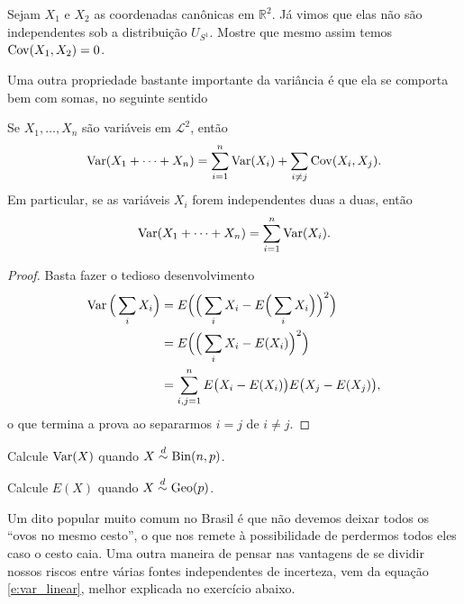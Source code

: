 \begin{exercise}
  Sejam $X_1$ e $X_2$ as coordenadas canônicas em $\mathbb{R}^2$.
  Já vimos que elas não são independentes sob a distribuição $U_{S^1}$.
  Mostre que mesmo assim temos $\operatorname{Cov}(X_1, X_2) = 0$.
\end{exercise}

Uma outra propriedade bastante importante da variância é que ela se comporta bem com somas, no seguinte sentido
\begin{proposition}
  Se $X_1, \dots, X_n$ são variáveis em $\mathcal{L}^2$, então
  \begin{equation}
    \operatorname{Var}(X_1 + \dots + X_n) = \sum_{i=1}^n \operatorname{Var}(X_i) + \sum_{i \neq j} \operatorname{Cov}(X_i, X_j).
  \end{equation}
  Em particular, se as variáveis $X_i$ forem independentes duas a duas, então
  \begin{equation}
    \label{e:var_linear}
    \operatorname{Var}(X_1 + \dots + X_n) = \sum_{i=1}^n \operatorname{Var}(X_i).
  \end{equation}
\end{proposition}

\begin{proof}
  Basta fazer o tedioso desenvolvimento
  \begin{equation}
    \begin{split}
      \operatorname{Var}\Big(\sum_i X_i\Big) & = E \Big( \Big(\sum_i X_i - E\Big(\sum_i X_i\Big)\Big)^2\Big)\\
      & = E \Big( \Big(\sum_i X_i - E(X_i)\Big)^2\Big)\\
      & = \sum_{i, j = 1}^n E \big(X_i - E(X_i)\big) E\big(X_j - E(X_j)\big),
    \end{split}
  \end{equation}
  o que termina a prova ao separarmos $i = j$ de $i \neq j$.
\end{proof}

\begin{exercise}
  Calcule $\operatorname{Var}(X)$ quando $X \overset{d}\sim \operatorname{Bin}(n, p)$.
\end{exercise}

\begin{exercise}
  Calcule $E(X)$ quando $X \overset{d}\sim \operatorname{Geo}(p)$.
\end{exercise}

Um dito popular muito comum no Brasil é que não devemos deixar todos os ``ovos no mesmo cesto'', o que nos remete à possibilidade de perdermos todos eles caso o cesto caia.
Uma outra maneira de pensar nas vantagens de se dividir nossos riscos entre várias fontes independentes de incerteza, vem da equação \eqref{e:var_linear}, melhor explicada no exercício abaixo.

